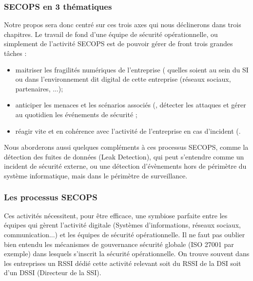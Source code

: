 \begin{frame}
\frametitle<presentation>{SECOPS en 3 thématiques}
Notre propos sera donc centré sur ces trois axes  qui nous déclinerons dans trois chapitres. Le travail de fond d'une équipe de sécurité opérationnelle, ou simplement de l'activité SECOPS est de pouvoir gérer de front trois grandes tâches : 
\begin{itemize}
 \item maitriser les fragilités numériques de l'entreprise ( quelles soient au sein du SI ou dans l'environnement dit digital de cette entreprise (réseaux sociaux, partenaires, ...);
 \item anticiper les menaces et les scénarios associés (, détecter les attaques et gérer au quotidien les événements de sécurité ;
 \item réagir vite et en cohérence avec l'activité de l'entreprise en cas d'incident (.
\end{itemize}
\end{frame}

Nous aborderons aussi quelques compléments à ces processus SECOPS, comme la détection des fuites de données (Leak Detection), qui peut s'entendre comme un incident de sécurité externe, ou une détection d'évènements hors de périmètre du système informatique, mais dans le périmètre de surveillance.

\begin{frame}
\frametitle<presentation>{Les processus SECOPS}

\end{frame}

Ces activités nécessitent, pour être efficace, une symbiose parfaite entre les équipes qui gèrent l'activité digitale (Systèmes d'informations, réseaux sociaux,  communication...) et les équipes de sécurité opérationnelle.
Il ne faut pas oublier bien entendu les mécanismes de gouvernance sécurité globale (ISO 27001 par exemple) dans lesquels s'inscrit la sécurité opérationnelle. On trouve souvent dans les entreprises un RSSI dédié cette activité relevant soit du RSSI de la DSI soit d'un DSSI (Directeur de la SSI).

